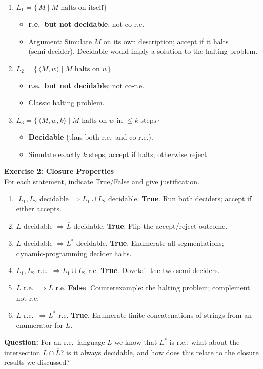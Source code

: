 \documentclass{article}
\theoremstyle{theorem}
\theoremstyle{definition}
\theoremstyle{remark}
\begin{document}
\begin{enumerate}
  \item \(L_1 = \{\,M \mid M \text{ halts on itself}\}\)  
        \begin{itemize}
          \item \textbf{r.e.\ but not decidable}; not co‑r.e.  
          \item Argument: Simulate \(M\) on its own description; accept if it halts (semi‑decider).  
                Decidable would imply a solution to the halting problem.
        \end{itemize}

  \item \(L_2 = \{\,\langle M,w\rangle \mid M \text{ halts on } w\}\)  
        \begin{itemize}
          \item \textbf{r.e.\ but not decidable}; not co‑r.e.  
          \item Classic halting problem.
        \end{itemize}

  \item \(L_3 = \{\,\langle M,w,k\rangle \mid M \text{ halts on } w \text{ in } \le k \text{ steps}\}\)  
        \begin{itemize}
          \item \textbf{Decidable} (thus both r.e.\ and co‑r.e.).  
          \item Simulate exactly \(k\) steps, accept if halts; otherwise reject.
        \end{itemize}

        
\end{enumerate}

\bigskip
\textbf{Exercise 2: Closure Properties}\\
For each statement, indicate True/False and give justification.

\begin{enumerate}
  \item \(\;L_1, L_2\) decidable \(\Rightarrow L_1 \cup L_2\) decidable. \textbf{True}.  
        Run both deciders; accept if either accepts.

  \item \(L\) decidable \(\Rightarrow \overline{L}\) decidable. \textbf{True}.  
        Flip the accept/reject outcome.

  \item \(L\) decidable \(\Rightarrow L^{*}\) decidable. \textbf{True}.  
        Enumerate all segmentations; dynamic‑programming decider halts.

  \item \(L_1, L_2\) r.e.\ \(\Rightarrow L_1 \cup L_2\) r.e. \textbf{True}.  
        Dovetail the two semi‑deciders.

  \item \(L\) r.e.\ \(\Rightarrow \overline{L}\) r.e. \textbf{False}.  
        Counterexample: the halting problem; complement not r.e.

  \item \(L\) r.e.\ \(\Rightarrow L^{*}\) r.e. \textbf{True}.  
        Enumerate finite concatenations of strings from an enumerator for \(L\).
\end{enumerate}

\textbf{Question: } For an r.e.\ language \(L\) we know that \(L^{*}\) is r.e.; what about the intersection  
        \(L \cap \overline{L}\)? is it always decidable, and how does this relate to the closure results we discussed?
\end{document}
